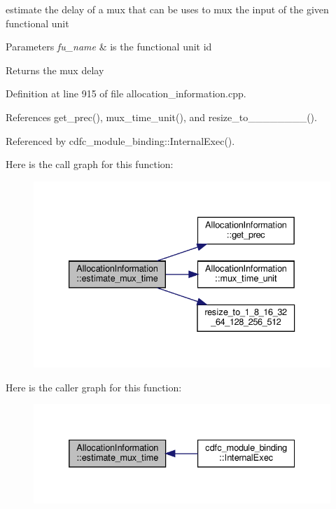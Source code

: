estimate the delay of a mux that can be uses to mux the input of the given functional unit 


\begin{DoxyParams}{Parameters}
{\em fu\+\_\+name} & is the functional unit id \\
\hline
\end{DoxyParams}
\begin{DoxyReturn}{Returns}
the mux delay 
\end{DoxyReturn}


Definition at line 915 of file allocation\+\_\+information.\+cpp.



References get\+\_\+prec(), mux\+\_\+time\+\_\+unit(), and resize\+\_\+to\+\_\+\_\+\_\+\_\+\_\+\_\+\_\+\_().



Referenced by cdfc\+\_\+module\+\_\+binding\+::\+Internal\+Exec().

Here is the call graph for this function\+:
\nopagebreak
\begin{figure}[H]
\begin{center}
\leavevmode
\includegraphics[width=333pt]{d7/d79/classAllocationInformation_aa0a32dbda0f86f889ed915dfdd3f5686_cgraph}
\end{center}
\end{figure}
Here is the caller graph for this function\+:
\nopagebreak
\begin{figure}[H]
\begin{center}
\leavevmode
\includegraphics[width=332pt]{d7/d79/classAllocationInformation_aa0a32dbda0f86f889ed915dfdd3f5686_icgraph}
\end{center}
\end{figure}
\mbox{\label{classAllocationInformation_aff550cbb8329a2ce4a4fad783ff06544}} 
